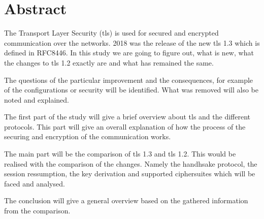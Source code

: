 \chapter*{Abstract}
\label{chap:abstract}
The Transport Layer Security (\gls{tls}) is used for secured and encrypted communication over the networks. 2018 was the release of the new \gls{tls} 1.3 which is defined in RFC8446. In this study we are going to figure out, what is new, what the changes to \gls{tls} 1.2 exactly are and what has remained the same. 

The questions of the particular improvement and the consequences, for example of the configurations or security will be identified. What was removed will also be noted and explained.

The first part of the study will give a brief overview about \gls{tls} and the different protocols. This part will give an overall explanation of how the process of the securing and encryption of the communication works. 

The main part will be the comparison of \gls{tls} 1.3 and \gls{tls} 1.2. This would be realised with the comparison of the changes. Namely the handhsake protocol, the session ressumption, the key derivation and supported ciphersuites which will be faced and analysed.

The conclusion will give a general overview based on the gathered information from the comparison.



